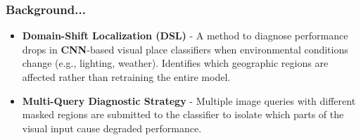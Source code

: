 \begin{frame}
\frametitle{Background...}

\begin{itemize}
    \item \textbf{Domain-Shift Localization (\textbf{DSL})} - A method to diagnose performance drops in \textbf{CNN}-based visual place classifiers when environmental conditions change (e.g., lighting, weather). Identifies which geographic regions are affected rather than retraining the entire model.

    \item \textbf{Multi-Query Diagnostic Strategy} - Multiple image queries with different masked regions are submitted to the classifier to isolate which parts of the visual input cause degraded performance.


\end{itemize}

\end{frame}
